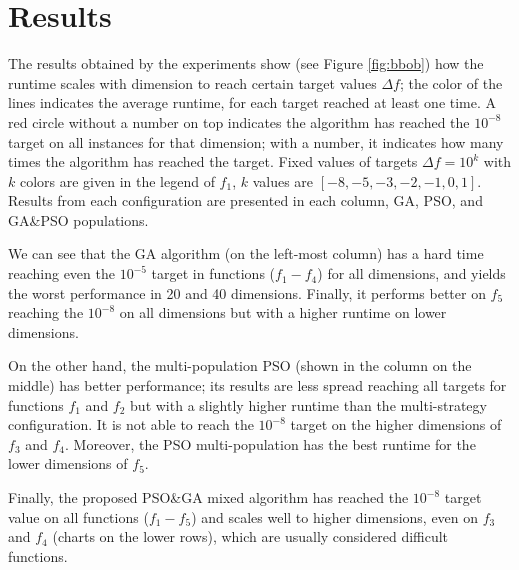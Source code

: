 \documentclass[runningheads]{llncs}
\begin{document}
\section{Results}
\label{results}

The results obtained by the experiments show (see Figure \ref{fig:bbob}) how
the runtime scales with dimension to reach certain target values $\Delta f$;
the color of the lines indicates the average runtime, for each target reached
at least one time. A red circle without a number on top indicates the algorithm
has reached the $10^{-8}$ target on all instances for that dimension;
with a number, it indicates how many times the algorithm has reached
the target. Fixed values of targets $\Delta f = 10^{k}$ with $k$ colors are
given in the legend of $f_1$, $k$ values are $[-8,-5,-3,-2,-1,0,1]$. Results
from each configuration are presented in each column, GA, PSO, and GA\&PSO
populations.

We can see that the GA algorithm (on the left-most column) has a hard time reaching even the
$10^{-5}$ target in functions ($f_1-f_4$) for all dimensions, and yields the worst
performance in 20 and 40 dimensions. Finally, it performs better on $f_5$
reaching the $10^{-8}$ on all dimensions but with a higher runtime on lower
dimensions. %

On the other hand, the multi-population PSO (shown in the column on the middle)
has better performance; its results are less spread
reaching all targets for functions $f_1$ and $f_2$ but with a slightly higher
runtime than the multi-strategy configuration. It is not able to reach the
$10^{-8}$ target on the higher dimensions of $f_3$ and $f_4$. Moreover, the PSO
multi-population has the best runtime for the lower dimensions of $f_5$.

Finally, the proposed PSO\&GA mixed algorithm has reached the $10^{-8}$ target
value on all functions ($f_1-f_5$) and scales well to higher dimensions, even
on $f_3$ and $f_4$ (charts on the lower rows), which are usually
considered difficult functions. %
\end{document}
